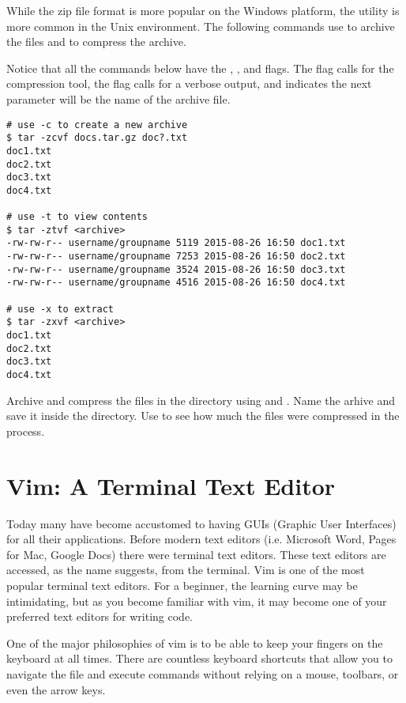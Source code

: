While the zip file format is more popular on the Windows platform, the  utility is more common in the Unix environment. The following commands use  to archive the files and  to compress the archive. 

Notice that all the commands below have the , , and  flags. The  flag calls for the  compression tool, the  flag calls for a verbose output, and  indicates the next parameter will be the name of the archive file. 

\begin{lstlisting}
# use -c to create a new archive
$ tar -zcvf docs.tar.gz doc?.txt 
doc1.txt
doc2.txt
doc3.txt
doc4.txt

# use -t to view contents
$ tar -ztvf <archive>                    
-rw-rw-r-- username/groupname 5119 2015-08-26 16:50 doc1.txt
-rw-rw-r-- username/groupname 7253 2015-08-26 16:50 doc2.txt
-rw-rw-r-- username/groupname 3524 2015-08-26 16:50 doc3.txt
-rw-rw-r-- username/groupname 4516 2015-08-26 16:50 doc4.txt

# use -x to extract
$ tar -zxvf <archive>                   
doc1.txt
doc2.txt
doc3.txt
doc4.txt
\end{lstlisting}

\begin{problem}
Archive and compress the files in the  directory using  and . Name the arhive  and save it inside the  directory. Use  to see how much the files were compressed in the process.
\end{problem}

\section*{Vim: A Terminal Text Editor}
Today many have become accustomed to having GUIs (Graphic User Interfaces) for all their applications. Before modern text editors (i.e. Microsoft Word, Pages for Mac, Google Docs) there were terminal text editors. 
These text editors are accessed, as the name suggests, from the terminal. Vim is one of the most popular terminal text editors. For a beginner, the learning curve may be intimidating, but as you become familiar with vim, it may become one of your preferred text editors for writing code.

One of the major philosophies of vim is to be able to keep your fingers on the keyboard at all times. There are countless keyboard shortcuts that allow you to navigate the file and execute commands without relying on a mouse, toolbars, or even the arrow keys.

